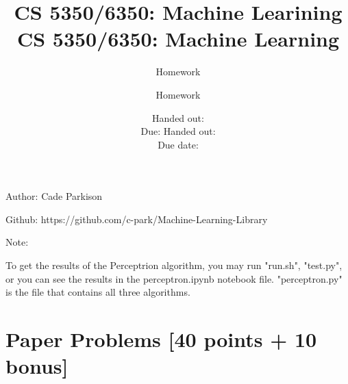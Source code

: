 \documentclass[12pt, fullpage,letterpaper]{article}
\title{CS 5350/6350: Machine Learining \semester}
\author{Homework \assignmentId}
\date{Handed out: \releaseDate\\
	Due: \dueDate}
\title{CS 5350/6350: Machine Learning \semester}
\author{Homework \assignmentId}
\date{Handed out: \releaseDate\\
  Due date: \dueDate}
\begin{document}
\maketitle


\newcommand{\Hcal}{\mathcal{H}} 
{\footnotesize
	Author: Cade Parkison
	
	Github: https://github.com/c-park/Machine-Learning-Library
	
	Note:
	
	To get the results of the Perceptrion algorithm, you may run "run.sh", "test.py", or you can see the results in the perceptron.ipynb notebook file. "perceptron.py" is the file that contains all three algorithms. 
}


\section{Paper Problems [40 points + 10 bonus]}
\end{document}
